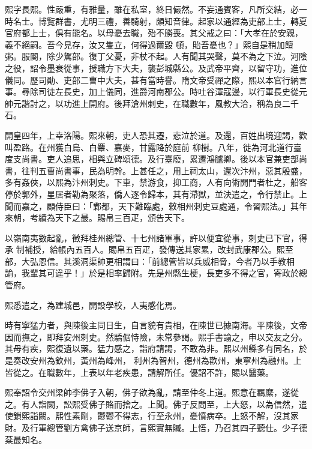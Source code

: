 \begin{pinyinscope}
 熙字長熙。性嚴重，有雅量，雖在私室，終日儼然。不妄通賓客，凡所交結，必一時名士。博覽群書，尤明三禮，善騎射，頗知音律。起家以通經為吏部上士，轉夏官府都上士，俱有能名。以母憂去職，殆不勝喪。其父戒之曰：「大孝在於安親，義不絕嗣。吾今見存，汝又隻立，何得過爾毀
 頓，貽吾憂也？」熙自是稍加饘粥。服闋，除少駕部。復丁父憂，非杖不起。人有聞其哭聲，莫不為之下泣。河陰之役，詔令墨衰從事，授職方下大夫，襲彭城縣公。及武帝平齊，以留守功，進位儀同。歷司勛、吏部二曹中大夫，甚有當時譽。隋文帝受禪之際，熙以本官行納言事。尋除司徒左長史，加上儀同，進爵河南郡公。時吐谷渾寇邊，以行軍長史從元帥元諧討之，以功進上開府。後拜滄州刺史，在職數年，風教大洽，稱為良二千石。



 開皇四年，上幸洛陽。熙來朝，吏人恐其遷，悲泣於道。及還，百姓出境迎謁，歡叫盈路。在州獲白烏、白麞、嘉麥，甘露降於庭前
 柳樹。八年，徙為河北道行臺度支尚書。吏人追思，相與立碑頌德。及行臺廢，累遷鴻臚卿。後以本官兼吏部尚書，往判五曹尚書事，民為明幹。上甚任之，用上祠太山，還次汴州，惡其殷盛，多有姦俠，以熙為汴州刺史。下車，禁游食，抑工商，人有向術開門者杜之，船客停於郭外，星居者勒為聚落，僑人逐令歸本，其有滯獄，並決遣之，令行禁止。上聞而嘉之，顧侍臣曰：「鄴都，天下難臨處，敕相州刺史豆處通，令習熙法。」其年來朝，考績為天下之最。賜帛三百疋，頒告天下。



 以嶺南夷數起亂，徵拜桂州總管、十七州諸軍事，許以便宜從事，刺史已下官，得承
 制補授，給帳內五百人。賜帛五百疋，發傳送其家累，改封武康郡公。熙至部，大弘恩信。其溪洞渠帥更相謂曰：「前總管皆以兵威相脅，今者乃以手教相諭，我輩其可違乎！」於是相率歸附。先是州縣生梗，長吏多不得之官，寄政於總管府。



 熙悉遣之，為建城邑，開設學校，人夷感化焉。



 時有寧猛力者，與陳後主同日生，自言貌有貴相，在陳世已據南海。平陳後，文帝因而撫之，即拜安州刺史。然驕倨恃險，未常參謁。熙手書諭之，申以交友之分。其母有疾，熙復遺以藥。猛力感之，詣府請謁，不敢為非。熙以州縣多有同名，於是奏改安州為欽州，黃州為峰州，
 利州為智州，德州為歡州，東寧州為融州。上皆從之。在職數年，上表以年老疾患，請解所任。優詔不許，賜以醫藥。



 熙奉詔令交州梁帥李佛子入朝，佛子欲為亂，請至仲冬上道。熙意在羈縻，遂從之。有人詣闕，訟熙受佛子賂而捨之。上聞。佛子反問至，上大怒，以為信然，遣使鎖熙詣闕。熙性素剛，鬱鬱不得志，行至永州，憂憤病卒。上怒不解，沒其家財。及行軍總管劉方禽佛子送京師，言熙實無贓。上悟，乃召其四子聽仕。少子德棻最知名。




\end{pinyinscope}
